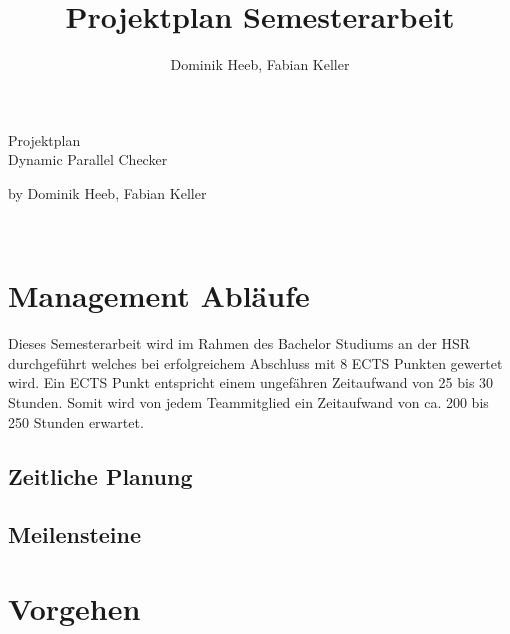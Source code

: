 \documentclass[10pt,a4paper]{article}
\author{Dominik Heeb, Fabian Keller}
\title{Projektplan Semesterarbeit}
\begin{document}
\begin{titlepage}
	\begin{Huge}
		\begin{center}
				Projektplan \\Dynamic Parallel Checker\\[2.0cm]
		\end{center}
	\end{Huge}
	
	\begin{Large}
		\begin{center}
				by Dominik Heeb, Fabian Keller		
		\end{center}
	\end{Large}
\end{titlepage}

\newpage
\tableofcontents 
\newpage

\
\section{Management Abläufe}
\begin{flushleft}
	Dieses Semesterarbeit wird im Rahmen des Bachelor Studiums an der HSR durchgeführt welches bei erfolgreichem Abschluss mit 8 ECTS Punkten gewertet wird. Ein ECTS Punkt entspricht einem ungefähren Zeitaufwand von 25 bis 30 Stunden. Somit wird von jedem Teammitglied ein Zeitaufwand von ca. 200 bis 250 Stunden erwartet.
\end{flushleft}

\subsection{Zeitliche Planung}
\begin{flushleft}
	
\end{flushleft}

\subsection{Meilensteine}
\section{Vorgehen}
\end{document}
